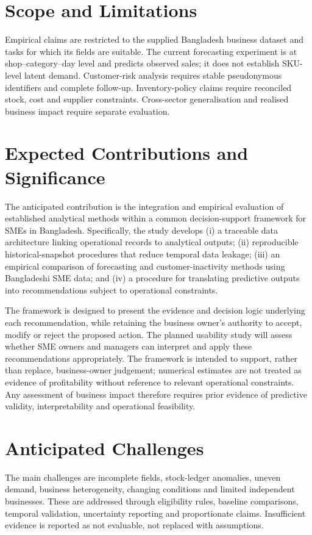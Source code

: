 \documentclass[a4paper,11pt,oneside]{book}
\theoremstyle{plain}
\theoremstyle{definition}
\theoremstyle{remark}
\begin{document}
\section{Scope and Limitations}
Empirical claims are restricted to the supplied Bangladesh business dataset
and tasks for which its fields are suitable. The current forecasting
experiment is at shop--category--day level and predicts observed sales; it
does not establish SKU-level latent demand. Customer-risk analysis requires
stable pseudonymous identifiers and complete follow-up. Inventory-policy
claims require reconciled stock, cost and supplier constraints. Cross-sector
generalisation and realised business impact require separate evaluation.

\section{Expected Contributions and Significance}

The anticipated contribution is the integration and empirical evaluation of
established analytical methods within a common decision-support framework for
SMEs in Bangladesh. Specifically, the study develops (i) a traceable data
architecture linking operational records to analytical outputs; (ii)
reproducible historical-snapshot procedures that reduce temporal data leakage;
(iii) an empirical comparison of forecasting and customer-inactivity methods
using Bangladeshi SME data; and (iv) a procedure for translating predictive
outputs into recommendations subject to operational constraints.

The framework is designed to present the evidence and decision logic
underlying each recommendation, while retaining the business owner's authority
to accept, modify or reject the proposed action. The planned usability study
will assess whether SME owners and managers can interpret and apply these
recommendations appropriately. The framework is intended to support, rather
than replace, business-owner judgement; numerical estimates are not treated as
evidence of profitability without reference to relevant operational
constraints. Any assessment of business impact therefore requires prior
evidence of predictive validity, interpretability and operational feasibility.


\section{Anticipated Challenges}
The main challenges are incomplete fields, stock-ledger anomalies, uneven
demand, business heterogeneity, changing conditions and limited independent
businesses. These are addressed through eligibility rules, baseline
comparisons, temporal validation, uncertainty reporting and proportionate
claims. Insufficient evidence is reported as not evaluable, not replaced
with assumptions.
\end{document}
